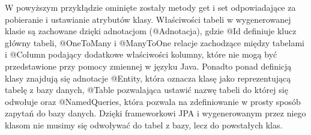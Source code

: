 W powyższym przykłądzie ominięte zostały metody get i set odpowiadające za pobieranie i ustawianie atrybutów klasy. Właściwości tabeli w wygenerowanej klasie są zachowane dzięki adnotacjom (@Adnotacja), gdzie @Id definiuje klucz główny tabeli, @OneToMany i @ManyToOne relacje zachodzące między tabelami i @Column podający dodatkowe właściwości kolumny, które nie mogą być przedstawione przy pomocy zmiennej w języku Java. Ponadto ponad definicją klasy znajdują się adnotacje @Entity, która oznacza klasę jako reprezentującą tabelę z bazy danych, @Table pozwalająca ustawić nazwę tabeli do której się odwołuje oraz @NamedQueries, która pozwala na zdefiniowanie w prosty sposób zapytań do bazy danych. Dzięki frameworkowi JPA i wygenerowanym przez niego klasom nie musimy się odwoływać do tabel z bazy, lecz do powstałych klas.

